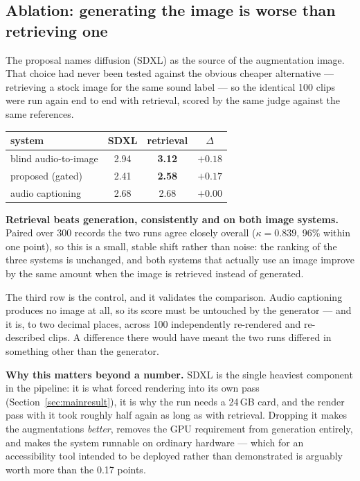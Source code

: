 \documentclass[11pt,a4paper]{article}
\begin{document}
\subsection{Ablation: generating the image is worse than retrieving one}\label{sec:genablation}
The proposal names diffusion (SDXL) as the source of the augmentation image. That choice had never
been tested against the obvious cheaper alternative --- retrieving a stock image for the same sound
label --- so the identical 100 clips were run again end to end with retrieval, scored by the same
judge against the same references.

\begin{center}\begin{tabular}{lccc}
\toprule
system & SDXL & retrieval & $\Delta$ \\
\midrule
blind audio-to-image & 2.94 & \textbf{3.12} & $+0.18$ \\
proposed (gated)     & 2.41 & \textbf{2.58} & $+0.17$ \\
audio captioning     & 2.68 & 2.68 & $+0.00$ \\
\bottomrule
\end{tabular}\end{center}

\textbf{Retrieval beats generation, consistently and on both image systems.} Paired over 300 records
the two runs agree closely overall ($\kappa = 0.839$, 96\% within one point), so this is a small,
stable shift rather than noise: the ranking of the three systems is unchanged, and both systems that
actually use an image improve by the same amount when the image is retrieved instead of generated.

The third row is the control, and it validates the comparison. Audio captioning produces no image at
all, so its score must be untouched by the generator --- and it is, to two decimal places, across 100
independently re-rendered and re-described clips. A difference there would have meant the two runs
differed in something other than the generator.

\textbf{Why this matters beyond a number.} SDXL is the single heaviest component in the pipeline: it
is what forced rendering into its own pass (Section~\ref{sec:mainresult}), it is why the run needs a
24\,GB card, and the render pass with it took roughly half again as long as with retrieval. Dropping
it makes the augmentations \emph{better}, removes the GPU requirement from generation entirely, and
makes the system runnable on ordinary hardware --- which for an accessibility tool intended to be
deployed rather than demonstrated is arguably worth more than the 0.17 points.
\end{document}

